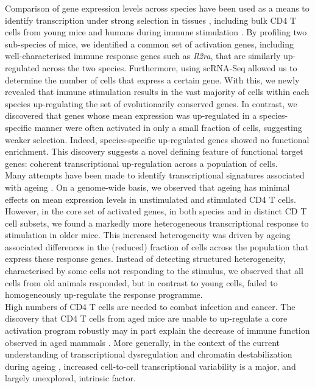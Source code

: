 Comparison of gene expression levels across species have been used as a means to identify transcription under strong selection in tissues \citep{Sudmant2015, Brawand2011, Romero2012, Barbosa-Morais2012, Perry2012}, including bulk CD4\plus{} T cells from young mice and humans during immune stimulation \citep{Shay2013}. By profiling two sub-species of mice, we identified a common set of activation genes, including well-characterised immune response genes such as \textit{Il2ra}, that are similarly up-regulated across the two species. Furthermore, using scRNA-Seq allowed us to determine the number of cells that express a certain gene. With this, we newly revealed that immune stimulation results in the vast majority of cells within each species up-regulating the set of evolutionarily conserved genes. In contrast, we discovered that genes whose mean expression was up-regulated in a species-specific manner were often activated in only a small fraction of cells, suggesting weaker selection. Indeed, species-specific up-regulated genes showed no functional enrichment. This discovery suggests a novel defining feature of functional target genes: coherent transcriptional up-regulation across a population of cells. \\

Many attempts have been made to identify transcriptional signatures associated with ageing \citep{DeMagalhaes2009, Magalhaes2009, Chen2013, Kowalczyk2015}. On a genome-wide basis, we observed that ageing has minimal effects on mean expression levels in unstimulated and stimulated CD4\plus{} T cells. However, in the core set of activated genes, in both species and in distinct CD\plus{} T cell subsets, we found a markedly more heterogeneous transcriptional response to stimulation in older mice. This increased heterogeneity was driven by ageing associated differences in the (reduced) fraction of cells across the population that express these response genes. Instead of detecting structured heterogeneity, characterised by some cells not responding to the stimulus, we observed that all cells from old animals responded, but in contrast to young cells, failed to homogeneously up-regulate the response programme. \\

High numbers of CD4\plus{} T cells are needed to combat infection and cancer. The discovery that CD4\plus{} T cells from aged mice are unable to up-regulate a core activation program robustly may in part explain the decrease of immune function observed in aged mammals \citep{Goronzy2013, Nikolich-Zugich2018}. More generally, in the context of the current understanding of transcriptional dysregulation and chromatin destabilization during ageing \citep{Booth2016}, increased cell-to-cell transcriptional variability is a major, and largely unexplored, intrinsic factor.\\

